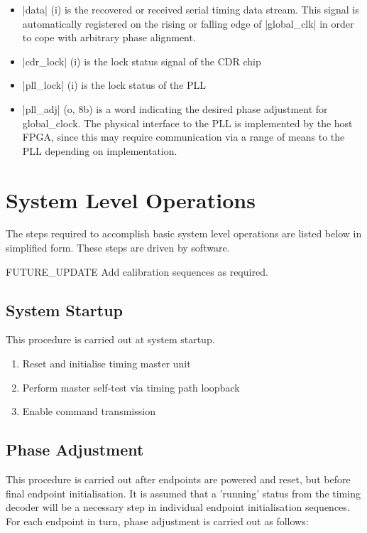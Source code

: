 \documentclass[a4paper,11pt]{article}
\begin{document}
\begin{itemize}
	\item |data| (i) is the recovered or received serial timing data stream. This signal is automatically registered on the rising or falling edge of |global_clk| in order to cope with arbitrary phase alignment.
	\item |cdr_lock| (i) is the lock status signal of the CDR chip
	\item |pll_lock| (i) is the lock status of the PLL
	\item |pll_adj| (o, 8b) is a word indicating the desired phase adjustment for global\_clock. The physical interface to the PLL is implemented by the host FPGA, since this may require communication via a range of means to the PLL depending on implementation.
\end{itemize}

\section{System Level Operations}

The steps required to accomplish basic system level operations are listed below in simplified form. These steps are driven by software.

{\color{red}FUTURE\_UPDATE} Add calibration sequences as required.

\subsection{System Startup}

This procedure is carried out at system startup.

\begin{enumerate}
	\item Reset and initialise timing master unit
	\item Perform master self-test via timing path loopback
	\item Enable command transmission
\end{enumerate}

\subsection{Phase Adjustment}

This procedure is carried out after endpoints are powered and reset, but before final endpoint initialisation. It is assumed that a 'running' status from the timing decoder will be a necessary step in individual endpoint initialisation sequences. For each endpoint in turn, phase adjustment is carried out as follows:
\end{document}
